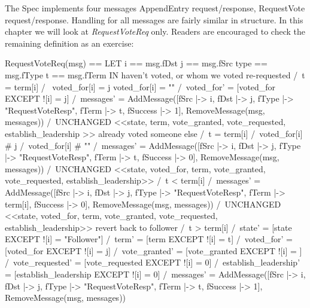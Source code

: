 \documentclass{report}
\begin{document}
The Spec implements four messages AppendEntry request/response, RequestVote
request/response. Handling for all messages are fairly similar in structure. In
this chapter we will look at \textit{RequestVoteReq} only. Readers are
encouraged to check the remaining definition as an exercise:\newline

\begin{tla}
RequestVoteReq(msg) == 
    LET 
        i == msg.fDst
        j == msg.fSrc
        type == msg.fType
        t == msg.fTerm
    IN 
        \* haven't voted, or whom we voted re-requested
        \/ /\ t = term[i]
           /\ \/ voted_for[i] = j 
              \/ voted_for[i] = ""
           /\ voted_for' = [voted_for EXCEPT ![i] = j]
           /\ messages' = AddMessage([fSrc |-> i, 
                                        fDst |-> j, 
                                        fType |-> "RequestVoteResp",
                                        fTerm |-> t, 
                                        fSuccess |-> 1],
                                        RemoveMessage(msg, messages))
           /\ UNCHANGED <<state, term, vote_granted, vote_requested, establish_leadership >>
        \* already voted someone else
        \/ /\ t = term[i]
           /\ voted_for[i] # j 
           /\ voted_for[i] # ""
           /\ messages' = AddMessage([fSrc |-> i, 
                                        fDst |-> j, 
                                        fType |-> "RequestVoteResp",
                                        fTerm |-> t, 
                                        fSuccess |-> 0],
                                        RemoveMessage(msg, messages))
            /\ UNCHANGED <<state, voted_for, term, vote_granted, vote_requested, establish_leadership>>
        \/  /\ t < term[i]
            /\ messages' = AddMessage([fSrc |-> i, 
                                        fDst |-> j, 
                                        fType |-> "RequestVoteResp",
                                        fTerm |-> term[i], 
                                        fSuccess |-> 0],
                                        RemoveMessage(msg, messages))
            /\ UNCHANGED <<state, voted_for, term, vote_granted, vote_requested, establish_leadership>>
        \* revert back to follower
        \/  /\ t > term[i]
            /\ state' = [state EXCEPT ![i] = "Follower"]
            /\ term' = [term EXCEPT ![i] = t]
            /\ voted_for' = [voted_for EXCEPT ![i] = j]
            /\ vote_granted' = [vote_granted EXCEPT ![i] = {}]
            /\ vote_requested' = [vote_requested EXCEPT ![i] = 0]
            /\ establish_leadership' = [establish_leadership EXCEPT ![i] = 0]
            /\ messages' = AddMessage([fSrc |-> i, 
                                        fDst |-> j, 
                                        fType |-> "RequestVoteResp",
                                        fTerm |-> t, 
                                        fSuccess |-> 1],
                                        RemoveMessage(msg, messages))
\end{tla}
\end{document}
